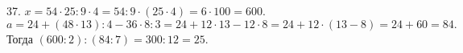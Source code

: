 37. $x=54\cdot25:9\cdot4=54:9\cdot(25\cdot4)=6\cdot100=600.$ $a=24+(48\cdot13):4-36\cdot8:3=24+12\cdot13-12\cdot8=24+12\cdot(13-8)=24+60=84.$ Тогда
$(600:2):(84:7)=300:12=25.$\\
